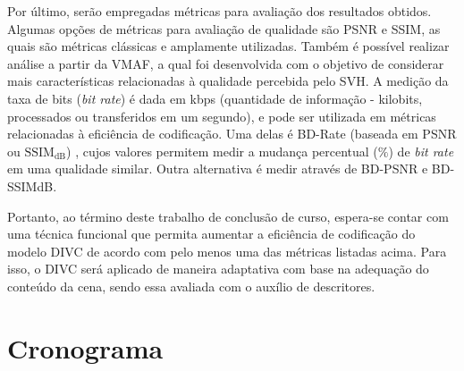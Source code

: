 Por último, serão empregadas métricas para avaliação dos resultados obtidos.
Algumas opções de métricas para avaliação de qualidade são \ac{PSNR} e \ac{SSIM}, as quais são métricas clássicas e amplamente utilizadas.
Também é possível realizar análise a partir da \ac{VMAF}, a qual foi desenvolvida com o objetivo de considerar mais características relacionadas à qualidade percebida pelo \ac{SVH}.
A medição da taxa de bits (\textit{bit rate}) é dada em kbps (quantidade de informação - kilobits, processados ou transferidos em um segundo), e pode ser utilizada em métricas relacionadas à eficiência de codificação.
Uma delas é \ac{BD-Rate} (baseada em PSNR ou $\text{SSIM}_\text{dB}$) \cite{sullivan2001_bd}, cujos valores permitem medir a mudança percentual ($\%$) de \textit{bit rate} em uma qualidade similar.
Outra alternativa é medir através de \ac{BD-PSNR} e \ac{BD-SSIMdB}.


Portanto, ao término deste trabalho de conclusão de curso, espera-se contar com uma técnica funcional que permita aumentar a eficiência de codificação do modelo \ac{DIVC} de acordo com pelo menos uma das métricas listadas acima. Para isso, o \ac{DIVC} será aplicado de maneira adaptativa com base na adequação do conteúdo da cena, sendo essa avaliada com o auxílio de descritores.


\section{Cronograma}


